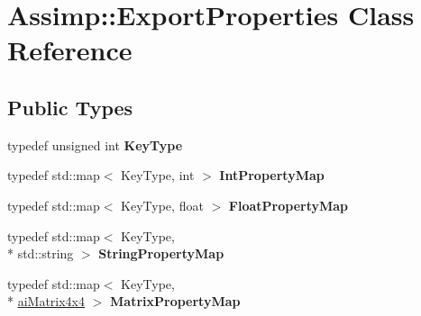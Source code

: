 \hypertarget{class_assimp_1_1_export_properties}{\section{Assimp\-:\-:Export\-Properties Class Reference}
\label{class_assimp_1_1_export_properties}
}
\subsection*{Public Types}
\begin{DoxyCompactItemize}
\item 
\hypertarget{class_assimp_1_1_export_properties_aa04b43f5e76d5f3c5431be9a35e706e6}{typedef unsigned int {\bfseries Key\-Type}}\label{class_assimp_1_1_export_properties_aa04b43f5e76d5f3c5431be9a35e706e6}

\item 
\hypertarget{class_assimp_1_1_export_properties_a5eb68bd8289eb42e495a7ce4e93d8b70}{typedef std\-::map$<$ Key\-Type, int $>$ {\bfseries Int\-Property\-Map}}\label{class_assimp_1_1_export_properties_a5eb68bd8289eb42e495a7ce4e93d8b70}

\item 
\hypertarget{class_assimp_1_1_export_properties_ac40aac30668fc66a6bb33d57b37e3d81}{typedef std\-::map$<$ Key\-Type, float $>$ {\bfseries Float\-Property\-Map}}\label{class_assimp_1_1_export_properties_ac40aac30668fc66a6bb33d57b37e3d81}

\item 
\hypertarget{class_assimp_1_1_export_properties_a8a0ab4fafe00d7ffdffd7ad40782c218}{typedef std\-::map$<$ Key\-Type, \\*
std\-::string $>$ {\bfseries String\-Property\-Map}}\label{class_assimp_1_1_export_properties_a8a0ab4fafe00d7ffdffd7ad40782c218}

\item 
\hypertarget{class_assimp_1_1_export_properties_adc9f7b8ed897e43a287138feec6f3d64}{typedef std\-::map$<$ Key\-Type, \\*
\hyperlink{structai_matrix4x4}{ai\-Matrix4x4} $>$ {\bfseries Matrix\-Property\-Map}}\label{class_assimp_1_1_export_properties_adc9f7b8ed897e43a287138feec6f3d64}

\end{DoxyCompactItemize}

